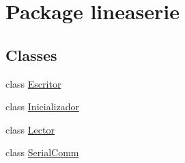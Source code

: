 \hypertarget{namespacelineaserie}{}\section{Package lineaserie}
\label{namespacelineaserie}
\subsection*{Classes}
\begin{DoxyCompactItemize}
\item 
class \mbox{\hyperlink{classlineaserie_1_1_escritor}{Escritor}}
\item 
class \mbox{\hyperlink{classlineaserie_1_1_inicializador}{Inicializador}}
\item 
class \mbox{\hyperlink{classlineaserie_1_1_lector}{Lector}}
\item 
class \mbox{\hyperlink{classlineaserie_1_1_serial_comm}{Serial\+Comm}}
\end{DoxyCompactItemize}
